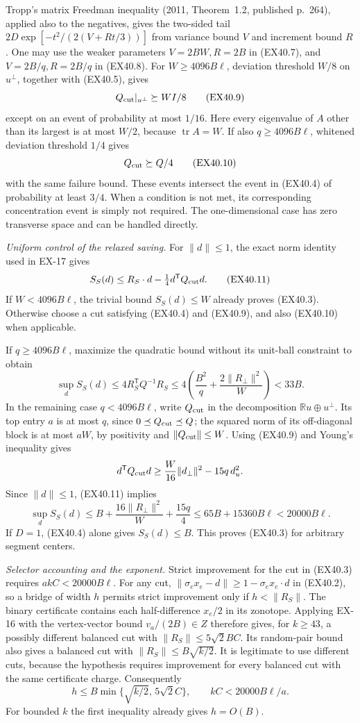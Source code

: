 Tropp's matrix Freedman inequality (2011, Theorem~1.2,
published p.~264), applied also to the negatives, gives the
two-sided tail
$2D\exp[-t^2/(2(V+Rt/3))]$ from variance bound $V$
and increment bound $R$. One may use the weaker parameters
$V=2BW,R=2B$ in (EX40.7), and
$V=2B/q,R=2B/q$ in (EX40.8).
For $W\ge4096B\ell$, deviation threshold $W/8$ on
$u^\perp$, together with (EX40.5), gives
\[
 Q_{\rm cut}|_{u^\perp}\succeq WI/8
 \tag{EX40.9}
\]
except on an event of probability at most $1/16$.
Here every eigenvalue of $A$ other than its largest is at most
$W/2$, because $\operatorname{tr}A=W$.
If also $q\ge4096B\ell$, whitened deviation threshold $1/4$
gives
\[
                         Q_{\rm cut}\succeq Q/4
 \tag{EX40.10}
\]
with the same failure bound. These events intersect the
event in (EX40.4) of probability at least $3/4$.
When a condition is not met, its corresponding concentration
event is simply not required. The one-dimensional case has
zero transverse space and can be handled directly.

\emph{Uniform control of the relaxed saving.}
For $\|d\|\le1$, the exact norm identity used in EX-17 gives
\[
 S_S(d)\le R_S\cdot d-\tfrac14d^{\mathsf T}Q_{\rm cut}d.
 \tag{EX40.11}
\]
If $W<4096B\ell$, the trivial bound $S_S(d)\le W$
already proves (EX40.3). Otherwise choose a cut satisfying
(EX40.4) and (EX40.9), and also (EX40.10) when applicable.

If $q\ge4096B\ell$, maximize the quadratic bound without its
unit-ball constraint to obtain
\[
 \sup_d S_S(d)
 \le4R_S^{\mathsf T}Q^{-1}R_S
 \le4\left(\frac{B^2}{q}
             +\frac{2\|R_\perp\|^2}{W}\right)<33B.
\]
In the remaining case $q<4096B\ell$, write
$Q_{\rm cut}$ in the decomposition $\mathbb Ru\oplus u^\perp$.
Its top entry $a$ is at most $q$, since $0\preceq Q_{\rm cut}\preceq Q$;
the squared norm of its off-diagonal block is at most $aW$,
by positivity and $\|Q_{\rm cut}\|\le W$.
Using (EX40.9) and Young's inequality gives
\[
 d^{\mathsf T}Q_{\rm cut}d
 \ge\frac W{16}\|d_\perp\|^2-15q\,d_u^2.
\]
Since $\|d\|\le1$, (EX40.11) implies
\[
 \sup_d S_S(d)
 \le B+\frac{16\|R_\perp\|^2}{W}+\frac{15q}{4}
 \le65B+15360B\ell<20000B\ell.
\]
If $D=1$, (EX40.4) alone gives $S_S(d)\le B$.
This proves (EX40.3) for arbitrary segment centers.

\emph{Selector accounting and the exponent.}
Strict improvement for the cut in (EX40.3) requires
$akC<20000B\ell$. For any cut,
$\|\sigma_ex_e-d\|\ge1-\sigma_ex_e\cdot d$ in (EX40.2),
so a bridge of width $h$ permits strict improvement only if
$h<\|R_S\|$. The binary certificate contains each
half-difference $x_e/2$ in its zonotope. Applying EX-16 with
the vertex-vector bound $v_a/(2B)\in Z$ therefore gives,
for $k\ge43$, a possibly different balanced cut with
$\|R_S\|\le5\sqrt2 BC$. Its random-pair bound also gives
a balanced cut with $\|R_S\|\le B\sqrt{k/2}$.
It is legitimate to use different cuts, because the hypothesis
requires improvement for every balanced cut with the same
certificate charge. Consequently
\[
 h\le B\min\{\sqrt{k/2},\,5\sqrt2 C\},
 \qquad
 kC<20000B\ell/a.
 \tag{EX40.12}
\]
For bounded $k$ the first inequality already gives $h=O(B)$.

